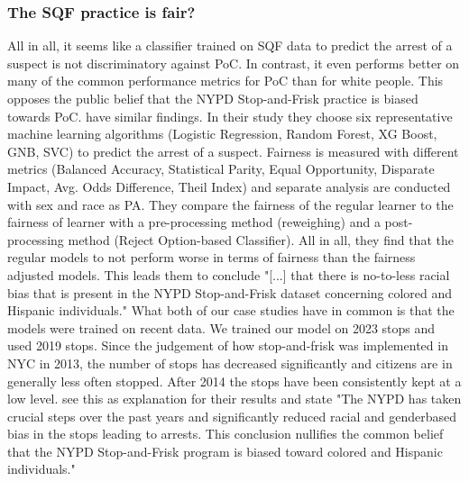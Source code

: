 \subsubsection*{The SQF practice is fair?}
All in all, it seems like a classifier trained on SQF data to predict the arrest of a suspect is not discriminatory against PoC. In contrast, it even performs better on many of the common performance metrics for PoC than for white people. This opposes the public belief that the NYPD Stop-and-Frisk practice is biased towards PoC. \cite{Badr2022DTFANSP} have similar findings.
In their study they choose six representative machine learning algorithms (Logistic Regression, Random Forest, XG Boost, GNB, SVC) to predict the arrest of a suspect. Fairness is measured with different metrics (Balanced Accuracy, Statistical Parity, Equal Opportunity, Disparate Impact, Avg. Odds Difference, Theil Index) and separate analysis are conducted with sex and race as PA.
They compare the fairness of the regular learner to the fairness of learner with a pre-processing method (reweighing) and a post-processing method (Reject Option-based Classifier). All in all, they find that the regular models to not perform worse in terms of fairness than the fairness adjusted models. This leads them to conclude "[...] that there is no-to-less racial bias that is present in the NYPD Stop-and-Frisk dataset concerning colored and Hispanic individuals."
What both of our case studies have in common is that the models were trained on recent data. We trained our model on 2023 stops and \cite{Badr2022DTFANSP} used 2019 stops. Since the judgement of how stop-and-frisk was implemented in NYC in 2013, the number of stops has decreased significantly and citizens are in generally less often stopped. After 2014 the stops have been consistently kept at a low level.
\cite{Badr2022DTFANSP} see this as explanation for their results and state "The NYPD has taken crucial steps over the past years and significantly reduced racial and genderbased bias in the stops leading to arrests. This conclusion nullifies the common belief that the NYPD Stop-and-Frisk program is biased toward colored and Hispanic individuals." 



